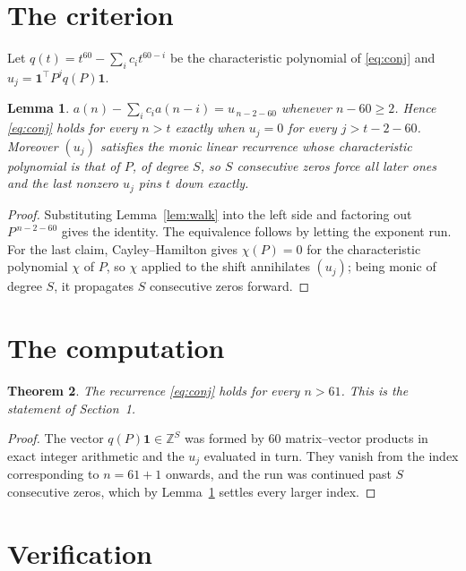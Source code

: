 \documentclass[11pt,a4paper]{article}
\theoremstyle{plain}
\newtheorem{theorem}{Theorem}
\newtheorem{lemma}[theorem]{Lemma}
\theoremstyle{definition}
\begin{document}
\section{The criterion}

Let $q(t)=t^{60}-\sum_i c_i t^{60-i}$ be the characteristic polynomial of
\eqref{eq:conj} and $u_j=\mathbf{1}^{\!\top}P^{j}q(P)\mathbf{1}$.

\begin{lemma}\label{lem:crit}
$a(n)-\sum_i c_i a(n-i)=u_{\,n-2-60}$ whenever $n-60\ge2$. Hence
\eqref{eq:conj} holds for every $n>t$ exactly when $u_j=0$ for every
$j>t-2-60$. Moreover $(u_j)$ satisfies the monic linear recurrence whose
characteristic polynomial is that of $P$, of degree $S$, so $S$ consecutive zeros force all
later ones and the last nonzero $u_j$ pins $t$ down exactly.
\end{lemma}

\begin{proof}
Substituting Lemma~\ref{lem:walk} into the left side and factoring out
$P^{\,n-2-60}$ gives the identity. The equivalence follows by letting the exponent
run. For the last claim, Cayley--Hamilton gives $\chi(P)=0$ for the characteristic
polynomial $\chi$ of $P$, so $\chi$ applied to the shift annihilates $(u_j)$; being monic of
degree $S$, it propagates $S$ consecutive zeros forward.
\end{proof}

\section{The computation}

\begin{theorem}
The recurrence \eqref{eq:conj} holds for every $n>61$. This is the statement of
Section~1.
\end{theorem}

\begin{proof}
The vector $q(P)\mathbf{1}\in\mathbb{Z}^{S}$ was formed by $60$ matrix--vector
products in exact integer arithmetic and the $u_j$ evaluated in turn. They vanish from the
index corresponding to $n=61+1$ onwards, and the run was continued past $S$ consecutive
zeros, which by Lemma~\ref{lem:crit} settles every larger index.
\end{proof}

\section{Verification}
\end{document}
